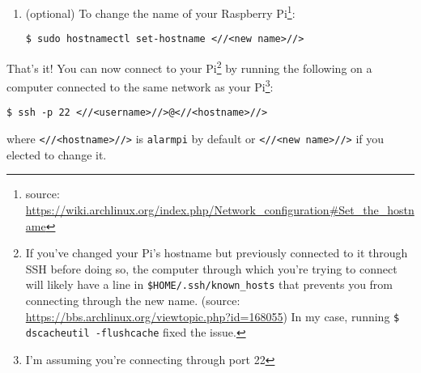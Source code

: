 \documentclass[12pt,letterpaper]{article}
\begin{document}
\begin{enumerate}
%

\item (optional) To change the name of your Raspberry Pi\footnote{source: \url{https://wiki.archlinux.org/index.php/Network_configuration\#Set_the_hostname}}:

\begin{lstlisting}
$ sudo hostnamectl set-hostname <//<new name>//>
\end{lstlisting}

\end{enumerate}

That's it!  You can now connect to your Pi\footnote{If you've changed your Pi's hostname but previously connected to it through SSH before doing so, the computer through which you're trying to connect will likely have a line in \lstinline{$HOME/.ssh/known_hosts} that prevents you from connecting through the new name. (source: \url{https://bbs.archlinux.org/viewtopic.php?id=168055})  In my case, running \lstinline{$ dscacheutil -flushcache} fixed the issue.} by running the following on a computer connected to the same network as your Pi\footnote{I'm assuming you're connecting through port 22}:
\begin{lstlisting}
$ ssh -p 22 <//<username>//>@<//<hostname>//>
\end{lstlisting}
where \lstinline{<//<hostname>//>} is \lstinline{alarmpi} by default or \lstinline{<//<new name>//>} if you elected to change it.
\end{document}

